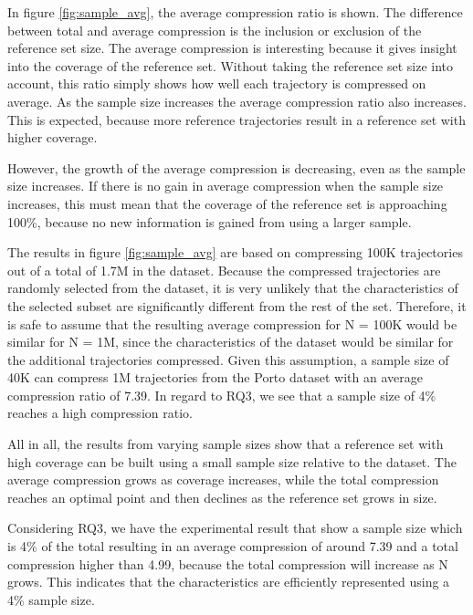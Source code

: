 In figure \ref{fig:sample_avg}, the average compression ratio is shown. The difference between total and average compression is the inclusion or exclusion of the reference set size. The average compression is interesting because it gives insight into the coverage of the reference set. Without taking the reference set size into account, this ratio simply shows how well each trajectory is compressed on average. As the sample size increases the average compression ratio also increases. This is expected, because more reference trajectories result in a reference set with higher coverage.

However, the growth of the average compression is decreasing, even as the sample size increases. If there is no gain in average compression when the sample size increases, this must mean that the coverage of the reference set is approaching 100\%, because no new information is gained from using a larger sample.

The results in figure \ref{fig:sample_avg} are based on compressing 100K trajectories out of a total of 1.7M in the dataset. Because the compressed trajectories are randomly selected from the dataset, it is very unlikely that the characteristics of the selected subset are significantly different from the rest of the set. Therefore, it is safe to assume that the resulting average compression for N = 100K would be similar for N = 1M, since the characteristics of the dataset would be similar for the additional trajectories compressed. Given this assumption, a sample size of 40K can compress 1M trajectories from the Porto dataset with an average compression ratio of 7.39. In regard to RQ3, we see that a sample size of 4\% reaches a high compression ratio.

All in all, the results from varying sample sizes show that a reference set with high coverage can be built using a small sample size relative to the dataset. The average compression grows as coverage increases, while the total compression reaches an optimal point and then declines as the reference set grows in size.

Considering RQ3, we have the experimental result that show a sample size which is 4\% of the total resulting in an average compression of around 7.39 and a total compression higher than 4.99, because the total compression will increase as N grows. This indicates that the characteristics are efficiently represented using a 4\% sample size.
